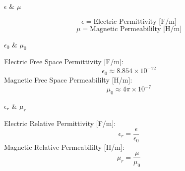 \begin{frame}{$\epsilon$ \& $\mu$}
    \begin{twocolumns}[0.5]
        \leftcol
            \begin{equation}
                \epsilon = \text{Electric Permittivity [F/m]}
            \end{equation}
            \begin{equation}
                \mu = \text{Magnetic Permeabililty [H/m]}
            \end{equation}
        \rightcol
    \end{twocolumns}
\end{frame}

\begin{frame}{$\epsilon_0$ \& $\mu_0$}
    \begin{twocolumns}[0.5]
        \leftcol
            Electric Free Space Permittivity [F/m]:
            \begin{equation}
                \epsilon_0 \approx 8.854\times 10^{-12}
            \end{equation}
            Magnetic Free Space Permeabililty [H/m]:
            \begin{equation}
                \mu_0 \approx 4\pi \times 10^{-7}
            \end{equation}
        \rightcol
    \end{twocolumns}
\end{frame}

\begin{frame}{$\epsilon_r$ \& $\mu_r$}
    \begin{twocolumns}[0.5]
        \leftcol
            Electric Relative Permittivity [F/m]:
            \begin{equation}
                \epsilon_r =\frac{\epsilon}{\epsilon_0}
            \end{equation}
            Magnetic Relative Permeabililty [H/m]:
            \begin{equation}
                \mu_r =\frac{\mu}{\mu_0}
            \end{equation}
        \rightcol
    \end{twocolumns}
\end{frame}

